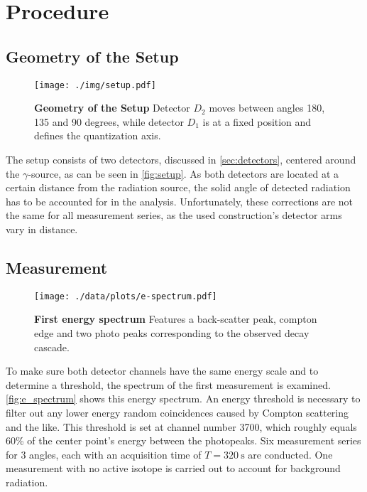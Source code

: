 \chapter{Procedure}

\section{Geometry of the Setup}
\begin{figure}[tbp]
	\centering
	\texttt{[image: ./img/setup.pdf]}
	\caption[Geometry of the Setup]{\textbf{Geometry of the Setup} Detector $D_2$ moves between angles 180, 135 and 90 degrees, while detector $D_1$ is at a fixed position and defines the quantization axis.}
	\label{fig:setup}
\end{figure}
The setup consists of two detectors, discussed in \autoref{sec:detectors}, centered around the $\gamma$-source, as can be seen in \autoref{fig:setup}.
As both detectors are located at a certain distance from the radiation source, the solid angle of detected radiation has to be accounted for in the analysis.
Unfortunately, these corrections are not the same for all measurement series, as the used construction's detector arms vary in distance.

\section{Measurement}
\begin{figure}[tbp]
	\centering
	\texttt{[image: ./data/plots/e-spectrum.pdf]}
	\caption[First energy spectrum]{\textbf{First energy spectrum} Features a back-scatter peak, compton edge and two photo peaks corresponding to the observed decay cascade.}
	\label{fig:e_spectrum}
\end{figure}
To make sure both detector channels have the same energy scale and to determine a threshold, the spectrum of the first measurement is examined.
\autoref{fig:e_spectrum} shows this energy spectrum.
An energy threshold is necessary to filter out any lower energy random coincidences caused by Compton scattering and the like.
This threshold is set at channel number 3700, which roughly equals 60\% of the center point's energy between the photopeaks.
Six measurement series for 3 angles, each with an acquisition time of $T=\SI{320}{\second}$ are conducted.
One measurement with no active isotope is carried out to account for background radiation.
